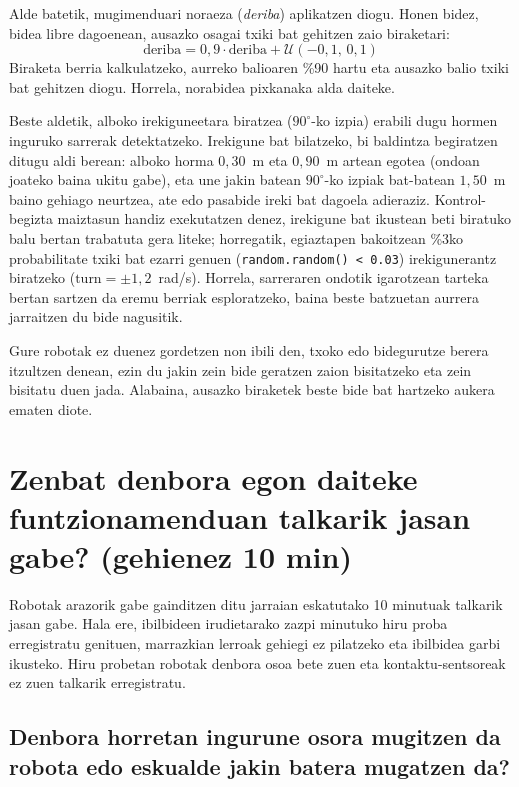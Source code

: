 Alde batetik, mugimenduari noraeza (\emph{deriba}) aplikatzen diogu. Honen bidez, bidea libre dagoenean, ausazko osagai txiki bat gehitzen zaio biraketari:
\[
  \text{deriba} = 0{,}9 \cdot \text{deriba} + \mathcal{U}(-0{,}1,\, 0{,}1)
\]
Biraketa berria kalkulatzeko, aurreko balioaren \%90 hartu eta ausazko balio txiki bat gehitzen diogu. Horrela, norabidea pixkanaka alda daiteke.

Beste aldetik, alboko irekiguneetara biratzea ($90^\circ$-ko izpia) erabili dugu hormen inguruko sarrerak detektatzeko. Irekigune bat bilatzeko, bi baldintza begiratzen ditugu aldi berean: alboko horma $0{,}30$~m eta $0{,}90$~m artean egotea (ondoan joateko baina ukitu gabe), eta une jakin batean $90^\circ$-ko izpiak bat-batean $1{,}50$~m baino gehiago neurtzea, ate edo pasabide ireki bat dagoela adieraziz. Kontrol-begizta maiztasun handiz exekutatzen denez, irekigune bat ikustean beti biratuko balu bertan trabatuta gera liteke; horregatik, egiaztapen bakoitzean \%3ko probabilitate txiki bat ezarri genuen (\texttt{random.random() < 0.03}) irekigunerantz biratzeko ($\text{turn} = \pm 1{,}2$~rad/s). Horrela, sarreraren ondotik igarotzean tarteka bertan sartzen da eremu berriak esploratzeko, baina beste batzuetan aurrera jarraitzen du bide nagusitik.

Gure robotak ez duenez gordetzen non ibili den, txoko edo bidegurutze berera itzultzen denean, ezin du jakin zein bide geratzen zaion bisitatzeko eta zein bisitatu duen jada. Alabaina, ausazko biraketek beste bide bat hartzeko aukera ematen diote.

\section[Zenbat denbora egon daiteke funtzionamenduan talkarik jasan gabe? (gehienez 10 min)][Talkarik gabeko funtzionamendua]{Zenbat denbora egon daiteke funtzionamenduan talkarik jasan gabe? (gehienez 10 min)}\label{sec:oz-emaitzak}

Robotak arazorik gabe gainditzen ditu jarraian eskatutako 10 minutuak talkarik jasan gabe. Hala ere, ibilbideen irudietarako zazpi minutuko hiru proba erregistratu genituen, marrazkian lerroak gehiegi ez pilatzeko eta ibilbidea garbi ikusteko. Hiru probetan robotak denbora osoa bete zuen eta kontaktu-sentsoreak ez zuen talkarik erregistratu.

\subsection{Denbora horretan ingurune osora mugitzen da robota edo eskualde jakin batera mugatzen da?}\label{sec:oz-ibilbideak}

